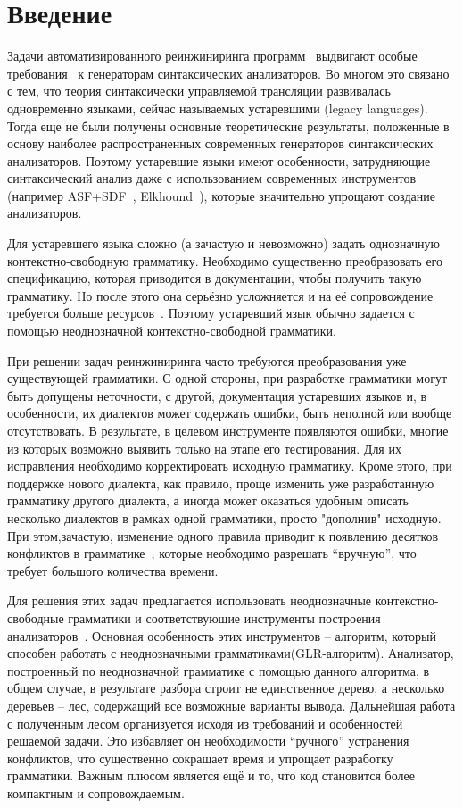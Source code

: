 \section{Введение}	

Задачи автоматизированного  реинжиниринга  программ~\cite{Reeng} выдвигают особые требования~\cite{CurrentParsTechn} к генераторам синтаксических анализаторов. Во многом это связано с тем, что теория синтаксически управляемой трансляции развивалась одновременно языками, сейчас называемых устаревшими (legacy languages). Тогда еще не были получены основные теоретические результаты, положенные в основу наиболее распространенных современных генераторов синтаксических анализаторов. Поэтому устаревшие языки имеют особенности, затрудняющие синтаксический анализ даже с использованием современных инструментов (например ASF+SDF~\cite{ASF+SDF}, Elkhound~\cite{Elkhound}), которые значительно упрощают создание анализаторов.

Для устаревшего языка сложно (а зачастую и невозможно) задать однозначную контекстно-свободную грамматику. Необходимо существенно преобразовать его спецификацию, которая приводится в документации, чтобы получить такую грамматику. Но после этого она серьёзно усложняется и на её сопровождение требуется больше ресурсов~\cite{CurrentParsTechn}. Поэтому устаревший язык обычно задается с помощью неоднозначной контекстно-свободной грамматики.

При решении задач реинжиниринга часто требуются преобразования уже существующей грамматики. С одной стороны, при разработке  грамматики могут быть допущены неточности, с другой, документация устаревших языков и, в особенности, их диалектов может содержать ошибки, быть неполной или вообще отсутствовать. В результате, в целевом инструменте появляются ошибки, многие из которых возможно выявить только на этапе его тестирования. Для их исправления необходимо корректировать исходную грамматику. Кроме этого, при поддержке нового диалекта, как правило, проще изменить уже разработанную грамматику другого диалекта, а иногда может оказаться удобным описать несколько диалектов в рамках одной грамматики, просто "дополнив" исходную. При этом,зачастую, изменение одного правила приводит к появлению десятков конфликтов в грамматике~\cite{CurrentParsTechn}, которые необходимо разрешать "`вручную"', что требует большого количества времени. 

Для решения этих задач предлагается использовать неоднозначные контекстно-свободные грамматики и соответствующие инструменты построения анализаторов~\cite{CurrentParsTechn}. Основная особенность этих инструментов -- алгоритм, который способен работать с неоднозначными грамматиками(GLR-алгоритм). Анализатор, построенный по неоднозначной  грамматике с помощью данного алгоритма, в общем случае, в результате разбора строит не единственное дерево, а несколько деревьев -- лес, содержащий все возможные варианты вывода. Дальнейшая работа с полученным лесом организуется исходя из требований и  особенностей решаемой задачи. Это избавляет он необходимости "`ручного"' устранения конфликтов, что существенно сокращает время и упрощает разработку грамматики. Важным плюсом является ещё и то, что код становится более компактным и сопровождаемым.
      
